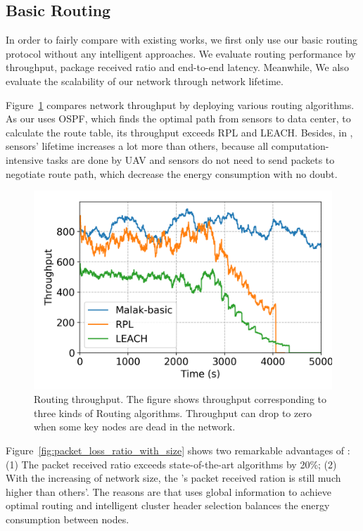 \subsection{Basic Routing}

In order to fairly compare with existing works, we first only use our basic
{\sdn} routing protocol without any intelligent approaches. We evaluate routing
performance by throughput, package received ratio and end-to-end latency.
Meanwhile, We also evaluate the scalability of our network through network
lifetime.

Figure~\ref{fig:throughput} compares network throughput by deploying various
routing algorithms. As our {\sdn} uses OSPF, which finds the optimal path from
sensors to data center, to calculate the route table, its throughput exceeds RPL
and LEACH. Besides, in {\sdn}, sensors' lifetime increases a lot more than
others, because all computation-intensive tasks are done by UAV and sensors do
not need to send packets to negotiate route path, which decrease the energy
consumption with no doubt.

\begin{figure}[htbp]
	\centering
	\includegraphics[width=.95\columnwidth]{Figure/throughput}
	\vspace{-0.1in}
	\caption{Routing throughput.
		\textnormal{
			The figure shows throughput corresponding to three kinds of Routing
			algorithms. Throughput can drop to zero when some key nodes are dead
			in the network.
		}}
	\label{fig:throughput}
\end{figure}

Figure~\ref{fig:packet_loss_ratio_with_size} shows two remarkable advantages of
{\sdn}: (1) The packet received ratio exceeds state-of-the-art
algorithms\cite{winter2012rpl, kaur2016wsn} by 20\%; (2) With the increasing of
network size, the {\sdn}'s packet received ration is still much higher than
others'. The reasons are that {\sdn} uses global information to achieve optimal
routing and intelligent cluster header selection balances the energy consumption
between nodes.

